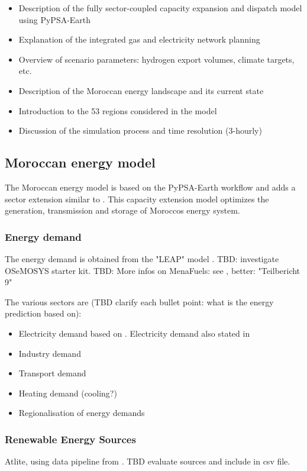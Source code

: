 \begin{itemize}
    \item Description of the fully sector-coupled capacity expansion and dispatch model using PyPSA-Earth
    \item Explanation of the integrated gas and electricity network planning
    \item Overview of scenario parameters: hydrogen export volumes, climate targets, etc.
    \item Description of the Moroccan energy landscape and its current state
    \item Introduction to the 53 regions considered in the model
    \item Discussion of the simulation process and time resolution (3-hourly)
\end{itemize}

\subsection{Moroccan energy model}
\label{subsec:moroccan_model}
The Moroccan energy model is based on the PyPSA-Earth workflow \cite{Parzen2022} and 
adds a sector extension similar to \cite{Brown2018a}.
This capacity extension model optimizes the generation, transmission and storage of Moroccos energy system.


\subsubsection{Energy demand}
The energy demand is obtained from the "LEAP" model \cite{Heaps2022}.
TBD: investigate OSeMOSYS starter kit.
TBD: More infos on MenaFuels: see \cite[p. 35]{Ersoy2022}, better: "Teilbericht 9"

The various sectors are (TBD clarify each bullet point: what is the energy prediction based on):
\begin{itemize}
    \item Electricity demand based on \cite{Parzen2022}. Electricity demand also stated in \cite[primary source 25]{Boulakhbar2020}
    \item Industry demand
    \item Transport demand
    \item Heating demand (cooling?) 
    \item Regionalisation of energy demands
\end{itemize}



\subsubsection{Renewable Energy Sources}
Atlite, using data pipeline from \cite{Parzen2022}. TBD evaluate sources and include in csv file.

